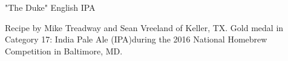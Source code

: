 \begin{recipe}{"The Duke" English IPA}

\begin{aboutblock}
Recipe by Mike Treadway and Sean Vreeland of Keller, TX. Gold medal in Category
17: India Pale Ale (IPA)during the 2016 National Homebrew Competition in Baltimore, MD. \sourceaha
\end{aboutblock}


\begin{methodandtiming}

\begin{mashsteps}
\end{mashsteps}

\begin{fermentationsteps}
\end{fermentationsteps}

\end{methodandtiming}

\recipebreak

\begin{ingredientsblock}

\begin{malts}
\end{malts}

\begin{hops}
\end{hops}


\end{ingredientsblock}

\end{recipe}
